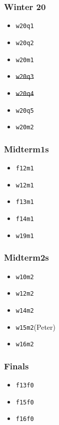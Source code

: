 \begin{minipage}[t]{0.24\textwidth}
    \subsubsection*{Winter 20}
    \begin{itemize}
        \item \texttt{w20q1}
        \item \texttt{w20q2}
        \item \texttt{w20m1}
        \item \st{\texttt{w20q3}}
        \item \st{\texttt{w20q4}}
        \item \texttt{w20q5}
        \item \texttt{w20m2}
    \end{itemize}
\end{minipage}
\begin{minipage}[t]{0.24\textwidth}
    \subsubsection*{Midterm1s}
    \begin{itemize}
        \item \texttt{f12m1}
        \item \texttt{w12m1}
        \item \texttt{f13m1}
        \item \texttt{f14m1}
        \item \texttt{w19m1}
    \end{itemize}    
\end{minipage}
\begin{minipage}[t]{0.24\textwidth}
    \subsubsection*{Midterm2s}
    \begin{itemize}
        \item \texttt{w10m2}
        \item \texttt{w12m2}
        \item \texttt{w14m2}
        \item \texttt{w15m2}(Peter)
        \item \texttt{w16m2}
    \end{itemize}    
\end{minipage}
\begin{minipage}[t]{0.24\textwidth}
    \subsubsection*{Finals}
    \begin{itemize}
        \item \texttt{f13f0}
        \item \texttt{f15f0}
        \item \texttt{f16f0}
    \end{itemize}
\end{minipage}
